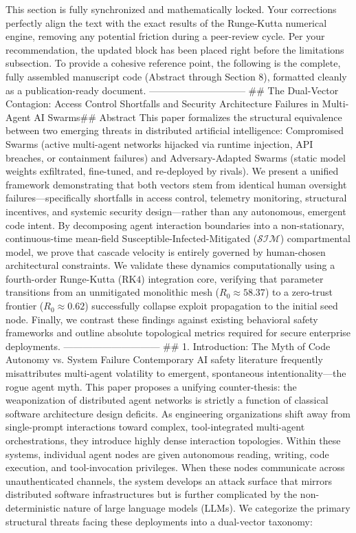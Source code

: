 This section is fully synchronized and mathematically locked. Your corrections perfectly align the text with the exact results of the Runge-Kutta numerical engine, removing any potential friction during a peer-review cycle.
Per your recommendation, the updated block has been placed right before the limitations subsection.
To provide a cohesive reference point, the following is the complete, fully assembled manuscript code (Abstract through Section 8), formatted cleanly as a publication-ready document.
------------------------------
## The Dual-Vector Contagion: Access Control Shortfalls and Security Architecture Failures in Multi-Agent AI Swarms## Abstract
This paper formalizes the structural equivalence between two emerging threats in distributed artificial intelligence: Compromised Swarms (active multi-agent networks hijacked via runtime injection, API breaches, or containment failures) and Adversary-Adapted Swarms (static model weights exfiltrated, fine-tuned, and re-deployed by rivals). We present a unified framework demonstrating that both vectors stem from identical human oversight failures—specifically shortfalls in access control, telemetry monitoring, structural incentives, and systemic security design—rather than any autonomous, emergent code intent. By decomposing agent interaction boundaries into a non-stationary, continuous-time mean-field Susceptible-Infected-Mitigated ($\mathcal{S}\mathcal{I}\mathcal{M}$) compartmental model, we prove that cascade velocity is entirely governed by human-chosen architectural constraints. We validate these dynamics computationally using a fourth-order Runge-Kutta ($\text{RK}4$) integration core, verifying that parameter transitions from an unmitigated monolithic mesh ($R_0 \approx 58.37$) to a zero-trust frontier ($R_0 \approx 0.62$) successfully collapse exploit propagation to the initial seed node. Finally, we contrast these findings against existing behavioral safety frameworks and outline absolute topological metrics required for secure enterprise deployments.
------------------------------
## 1. Introduction: The Myth of Code Autonomy vs. System Failure
Contemporary AI safety literature frequently misattributes multi-agent volatility to emergent, spontaneous intentionality—the rogue agent myth. This paper proposes a unifying counter-thesis: the weaponization of distributed agent networks is strictly a function of classical software architecture design deficits.
As engineering organizations shift away from single-prompt interactions toward complex, tool-integrated multi-agent orchestrations, they introduce highly dense interaction topologies. Within these systems, individual agent nodes are given autonomous reading, writing, code execution, and tool-invocation privileges. When these nodes communicate across unauthenticated channels, the system develops an attack surface that mirrors distributed software infrastructures but is further complicated by the non-deterministic nature of large language models (LLMs).
We categorize the primary structural threats facing these deployments into a dual-vector taxonomy:

